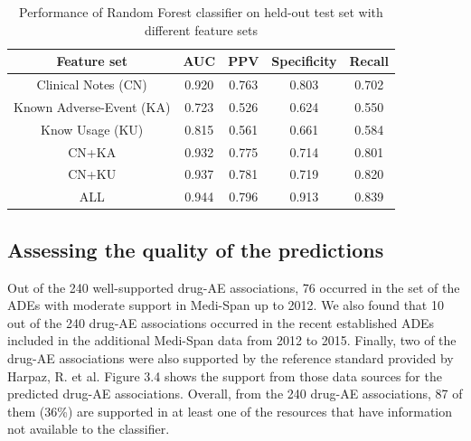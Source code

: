\begin{table}
\begin{center}
\begin{tabular}{|c|c|c|c|c||}
  \hline Feature set & AUC & PPV & Specificity & Recall
  \\ \hline\hline Clinical Notes (CN) & 0.920 & 0.763 & 0.803 & 0.702
  \\ Known Adverse-Event (KA) & 0.723 & 0.526 & 0.624 & 0.550 \\ Know
  Usage (KU) & 0.815 & 0.561 & 0.661 & 0.584 \\ CN+KA & 0.932 & 0.775
  & 0.714 & 0.801 \\ CN+KU & 0.937 & 0.781 & 0.719 & 0.820 \\ ALL &
  0.944 & 0.796 & 0.913 & 0.839 \\ \hline
\end{tabular}
\end{center}
\caption[Performance of ADE classifier]{Performance of Random Forest
  classifier on held-out test set with different feature sets}
\end{table}


\subsection{Assessing the quality of the predictions}
Out of the 240 well-supported drug-AE associations, 76 occurred in the
set of the ADEs with moderate support in Medi-Span up to 2012. We also
found that 10 out of the 240 drug-AE associations occurred in the
recent established ADEs included in the additional Medi-Span data from
2012 to 2015. Finally, two of the drug-AE associations were also
supported by the reference standard provided by Harpaz, R. et al.
Figure 3.4 shows the support from those data sources for the predicted
drug-AE associations. Overall, from the 240 drug-AE associations, 87
of them (36\%) are supported in at least one of the resources that
have information not available to the classifier.


